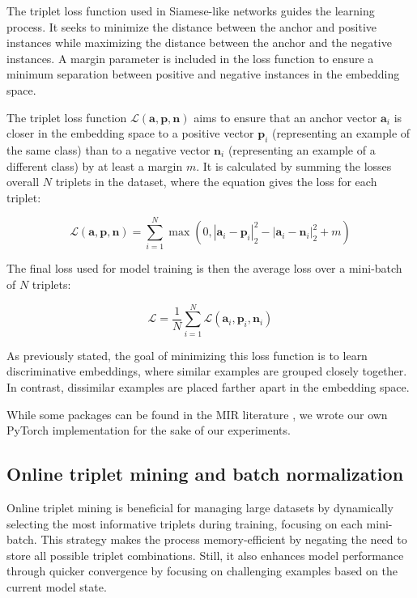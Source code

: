 The triplet loss function used in Siamese-like networks guides the learning process. It seeks to minimize the distance between the anchor and positive instances while maximizing the distance between the anchor and the negative instances. A margin parameter is included in the loss function to ensure a minimum separation between positive and negative instances in the embedding space.

The triplet loss function $\mathcal{L}(\mathbf{a}, \mathbf{p}, \mathbf{n})$ aims to ensure that an anchor vector $\mathbf{a}_i$ is closer in the embedding space to a positive vector $\mathbf{p}_i$ (representing an example of the same class) than to a negative vector $\mathbf{n}_i$ (representing an example of a different class) by at least a margin $m$. It is calculated by summing the losses overall $N$ triplets in the dataset, where the equation gives the loss for each triplet:

\begin{equation}
\mathcal{L}(\mathbf{a}, \mathbf{p}, \mathbf{n}) = \sum_{i=1}^{N} \max \left(0, \left| \mathbf{a}_i - \mathbf{p}_i \right|_2^2 - \left| \mathbf{a}_i - \mathbf{n}_i \right|_2^2 + m \right)
\end{equation}

The final loss used for model training is then the average loss over a mini-batch of $N$ triplets:

\begin{equation}
\mathcal{L} = \frac{1}{N} \sum_{i=1}^{N} \mathcal{L}(\mathbf{a}_i, \mathbf{p}_i, \mathbf{n}_i)
\end{equation}

As previously stated, the goal of minimizing this loss function is to learn discriminative embeddings, where similar examples are grouped closely together. In contrast, dissimilar examples are placed farther apart in the embedding space.

While some packages can be found in the MIR literature \cite{auraloss}, we wrote our own PyTorch \cite{Paszke2019PyTorch:Library} implementation for the sake of our experiments.

\subsection{Online triplet mining and batch normalization}

Online triplet mining is beneficial for managing large datasets by dynamically selecting the most informative triplets during training, focusing on each mini-batch. This strategy makes the process memory-efficient by negating the need to store all possible triplet combinations. Still, it also enhances model performance through quicker convergence by focusing on challenging examples based on the current model state.

